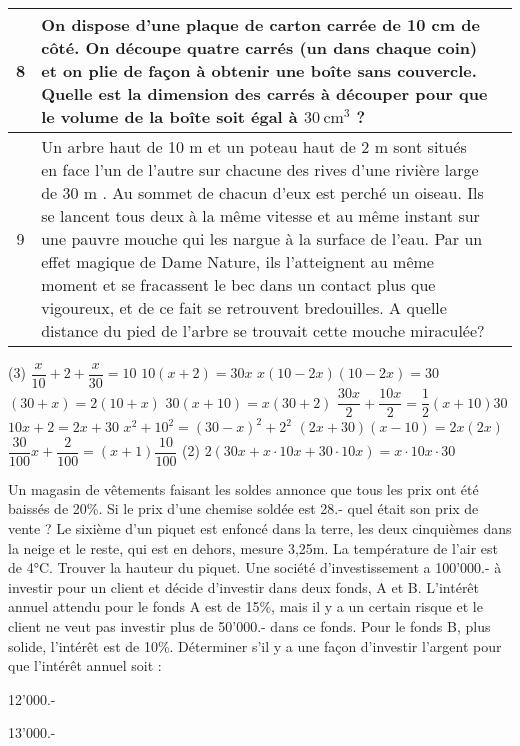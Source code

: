 \documentclass[a4paper,12pt]{article}
\begin{document}
\begin{activite}
\begin{tabularx}{\textwidth}{|c|X|c|}
\hline 8 & On dispose d'une plaque de carton carrée de 10 cm de côté. On découpe quatre carrés (un dans chaque coin) et on plie de façon à obtenir une boîte sans couvercle. Quelle est la dimension des carrés à découper pour que le volume de la boîte soit égal à $30 \mathrm{~cm}^3$ ? & \phantom{22}\\
\hline 9 & Un arbre haut de 10 m et un poteau haut de 2 m sont situés en face l'un de l'autre sur chacune des rives d'une rivière large de 30 m . Au sommet de chacun d'eux est perché un oiseau. Ils se lancent tous deux à la même vitesse et au même instant sur une pauvre mouche qui les nargue à la surface de l'eau. Par un effet magique de Dame Nature, ils l'atteignent au même moment et se fracassent le bec dans un contact plus que vigoureux, et de ce fait se retrouvent bredouilles. A quelle distance du pied de l'arbre se trouvait cette mouche miraculée? & \phantom{22}\\
\hline
\end{tabularx}

\vspace{5pt}

\begin{tasks}(3)
\task $\dfrac{x}{10}+2+\dfrac{x}{30}=10$
\task $10(x+2)=30 x$
\task $x(10-2 x)(10-2 x)=30$
\task $(30+x)=2(10+x)$
\task $30(x+10)=x(30+2)$
\task $\dfrac{30 x}{2}+\dfrac{10 x}{2}=\dfrac{1}{2}(x+10) 30$
\task $10 x+2=2 x+30$
\task $x^2+10^2=(30-x)^2+2^2$
\task $(2 x+30)(x-10)=2 x(2 x)$
\task $\dfrac{30}{100} x+\dfrac{2}{100}=(x+1) \dfrac{10}{100}$
\task*(2) $2(30 x+x \cdot 10 x+30 \cdot 10 x)=x \cdot 10 x \cdot 30$
\end{tasks}

\end{activite}
\begin{activite}
	\tcblower
	\begin{tasks}
   \task Un magasin de vêtements faisant les soldes annonce que tous les prix ont été baissés de 20\%. Si le prix d'une chemise soldée est 28.- quel était son prix de vente ?
    \task Le sixième d'un piquet est enfoncé dans la terre, les deux cinquièmes dans la neige et le reste, qui est en dehors, mesure 3,25m. La température de l'air est de 4°C. Trouver la hauteur du piquet.
    \task Une société d'investissement a 100'000.- à investir pour un client et décide d'investir dans deux fonds, A et B. L'intérêt annuel attendu pour le fonds A est de 15\%, mais il y a un certain risque et le client ne veut pas investir plus de 50'000.- dans ce fonds. Pour le fonds B, plus solide, l'intérêt est de 10\%. Déterminer s'il y a une façon d'investir l'argent pour que l'intérêt annuel soit :
    
    \begin{center}
    \begin{inlineumerate}
    \item 12'000.-\hspace{3cm}
        \item 13'000.-
    \end{inlineumerate}
\end{center}
\end{tasks}
\end{activite}
\end{document}
